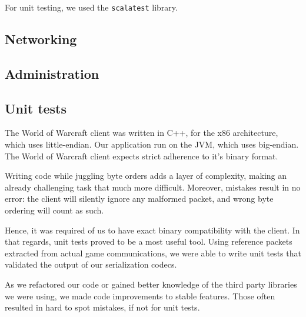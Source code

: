 \documentclass[paper=a4, fontsize=11pt]{scrartcl}
\begin{document}
For unit testing, we used the \texttt{scalatest} library.

\subsection{Networking}


\subsection{Administration}


\subsection{Unit tests}

The World of Warcraft client was written in C++, for the x86 architecture, which
uses little-endian. 
Our application run on the JVM, which uses big-endian.
The World of Warcraft client expects strict adherence to it's binary format.

Writing code while juggling byte orders adds a layer of complexity, making an
already challenging task that much more difficult.
Moreover, mistakes result in no error: the client will silently ignore any
malformed packet, and wrong byte ordering will count as such.

Hence, it was required of us to have exact binary compatibility with the client.
In that regards, unit tests proved to be a most useful tool.
Using reference packets extracted from actual game communications, we were able
to write unit tests that validated the output of our serialization codecs.

As we refactored our code or gained better knowledge of the third party
libraries we were using, we made code improvements to stable
features.
Those often resulted in hard to spot mistakes, if not for unit tests.

\end{document}
